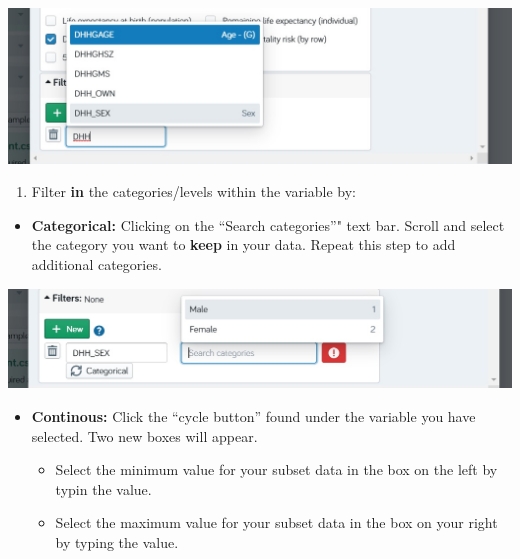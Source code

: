 \documentclass[]{book}
\providecommand{\tightlist}{%
  \setlength{\itemsep}{0pt}\setlength{\parskip}{0pt}}
\begin{document}
\begin{center}\includegraphics{Images/FilterSearch} \end{center}

\begin{enumerate}
\def\labelenumi{\arabic{enumi}.}
\setcounter{enumi}{3}
\tightlist
\item
  Filter \textbf{in} the categories/levels within the variable by:
\end{enumerate}

\begin{itemize}
\tightlist
\item
  \textbf{Categorical:} Clicking on the ``Search categories''" text bar.
  Scroll and select the category you want to \textbf{keep} in your data.
  Repeat this step to add additional categories.
\end{itemize}

\begin{center}\includegraphics{Images/FilterCat} \end{center}

\begin{itemize}
\tightlist
\item
  \textbf{Continous:} Click the ``cycle button'' found under the
  variable you have selected. Two new boxes will appear.

  \begin{itemize}
  \tightlist
  \item
    Select the minimum value for your subset data in the box on the left
    by typin the value.
  \item
    Select the maximum value for your subset data in the box on your
    right by typing the value.
  \end{itemize}
\end{itemize}
\end{document}
